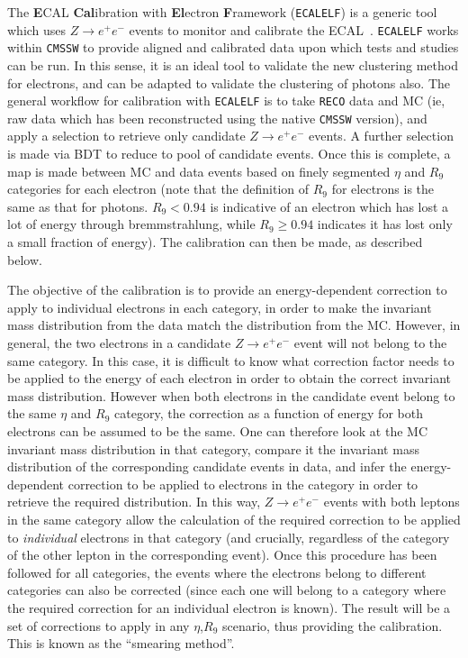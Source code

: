 \documentclass[10pt]{article}
\begin{document}
The \textbf{E}CAL \textbf{Cal}ibration with \textbf{El}ectron \textbf{F}ramework (\texttt{ECALELF}) is a generic tool which uses $Z \rightarrow e^+ e^-$ events to monitor and calibrate the ECAL~\cite{ecalelf}. \texttt{ECALELF} works within \texttt{CMSSW} to provide aligned and calibrated data upon which tests and studies can be run. In this sense, it is an ideal tool to validate the new clustering method for electrons, and can be adapted to validate the clustering of photons also. The general workflow for calibration with \texttt{ECALELF} is to take \texttt{RECO} data and MC (ie, raw data which has been reconstructed using the native \texttt{CMSSW} version), and apply a selection to retrieve only candidate $Z \rightarrow e^+ e^-$ events. A further selection is made via BDT to reduce to pool of candidate events. Once this is complete, a map is made between MC and data events based on finely segmented $\eta$ and $R_9$ categories for each electron (note that the definition of $R_9$ for electrons is the same as that for photons. $R_9 < 0.94$ is indicative of an electron which has lost a lot of energy through bremmstrahlung, while $R_9 \geq 0.94$ indicates it has lost only a small fraction of energy). The calibration can then be made, as described below.

The objective of the calibration is to provide an energy-dependent correction to apply to individual electrons in each category, in order to make the invariant mass distribution from the data match the distribution from the MC. However, in general, the two electrons in a candidate $Z \rightarrow e^+ e^-$ event will not belong to the same category. In this case, it is difficult to know what correction factor needs to be applied to the energy of each electron in order to obtain the correct invariant mass distribution. However when both electrons in the candidate event belong to the same $\eta$ and $R_9$ category, the correction as a function of energy for both electrons can be assumed to be the same. One can therefore look at the MC invariant mass distribution in that category, compare it the invariant mass distribution of the corresponding candidate events in data, and infer the energy-dependent correction to be applied to electrons in the category in order to retrieve the required distribution. In this way, $Z \rightarrow e^+ e^-$ events with both leptons in the same category allow the calculation of the required correction to be applied to \textit{individual} electrons in that category (and crucially, regardless of the category of the other lepton in the corresponding event). Once this procedure has been followed for all categories, the events where the electrons belong to different categories can also be corrected (since each one will belong to a category where the required correction for an individual electron is known). The result will be a set of corrections to apply in any $\eta$,$R_9$ scenario, thus providing the calibration. This is known as the ``smearing method''.
\end{document}
